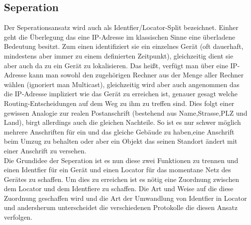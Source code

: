 \subsection{Seperation}
Der Seperationsansatz wird auch als Identfier/Locator-Split bezeichnet. Einher geht die Überlegung das eine IP-Adresse im klassischen Sinne eine überladene Bedeutung besitzt. Zum einen identifiziert sie ein einzelnes Gerät (oft dauerhaft, mindestens aber immer zu einem definierten Zeitpunkt), gleichzeitig dient sie aber auch da zu ein Gerät zu lokalisieren. Das heißt, verfügt man über eine IP-Adresse kann man sowohl den zugehörigen Rechner aus der Menge aller Rechner wählen (ignoriert man Multicast), gleichzeitig wird aber auch angenommen das die IP-Adresse impliziert wie das Gerät zu erreichen ist, genauer gesagt welche Routing-Entscheidungen auf dem Weg zu ihm zu treffen sind. Dies folgt einer gewissen Analogie zur realen Postanschrift (bestehend aus Name,Strasse,PLZ und Land), birgt allerdings auch die gleichen Nachteile. So ist es nur schwer möglich mehrere Anschriften für ein und das gleiche Gebäude zu haben,eine Anschrift beim Umzug zu behalten oder aber ein Objekt das seinen Standort ändert mit einer Anschrift zu versehen. \\
Die Grundidee der Seperation ist es nun diese zwei Funktionen zu trennen und einen Identfier für ein Gerät und einen Locator für das momentane Netz des Gerätes zu schaffen. Um dies zu erreichen ist es nötig eine Zuordnung zwischen dem Locator und dem Identfiere zu schaffen. Die Art und Weise auf die diese Zuordnung geschaffen wird und die Art der Umwandlung von Identfier in Locator und andersherum unterscheidet die verschiedenen Protokolle die diesen Ansatz verfolgen.
